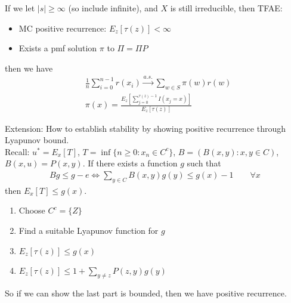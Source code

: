 If we let $|s|\geq \infty$ (so include infinite), and $X$ is still irreducible, then TFAE: 
    \begin{itemize}
        \item MC positive recurrence: $E_z[\tau(z)]<\infty$ 
        \item Exists a pmf solution $\pi$ to $\Pi = \Pi P$
    \end{itemize}
then we have 
    \begin{align*}
        & \frac{1}{n}\sum_{i=0}^{n-1}r(x_i) \overset{a.s.}{\to} \sum_{w\in S}\pi(w) r(w)\\
        & \pi(x) = \frac{E_z\left[\sum_{j=0}^{\tau(z)-1}I(x_j=x) \right]}{E_z[\tau(z)]}
    \end{align*}
    
Extension: How to establish stability by showing positive recurrence through Lyapunov bound. \\
Recall: $u^*=E_x[T]$, $T = \inf\{n\geq 0: x_n \in C^c \}$, $B = (B(x,y):x,y\in C)$, $B(x,u) = P(x,y)$. If there exists a function $g$ such that 
    \begin{align*}
        Bg \leq g-e \Longleftrightarrow \sum_{y\in C}B(x,y)g(y) \leq g(x)-1 \qquad \forall x
    \end{align*}
then $E_x[T]\leq g(x)$. 
    \begin{enumerate}
        \item Choose $C^c = \{ Z \} $
        \item Find a suitable Lyapunov function for $g$
        \item $E_z[\tau(z)]\leq g(x)$
        \item $E_z[\tau(z)]\leq 1 + \sum_{y\neq z} P(z,y)g(y)$
    \end{enumerate}
So if we can show the last part is bounded, then we have positive recurrence. 